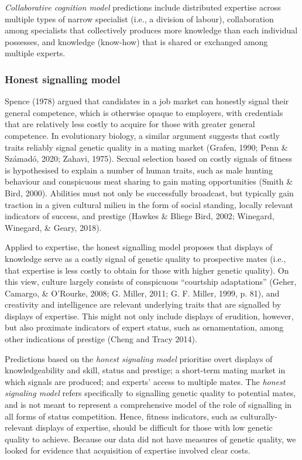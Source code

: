 \documentclass[
  11pt,
]{article}
\begin{document}
\emph{Collaborative cognition model} predictions include distributed expertise across multiple types of narrow specialist (i.e., a division of labour), collaboration among specialists that collectively produces more knowledge than each individual possesses, and knowledge (know-how) that is shared or exchanged among multiple experts.

\hypertarget{honest-signalling-model}{%
\subsubsection{Honest signalling model}\label{honest-signalling-model}}

Spence (1978) argued that candidates in a job market can honestly signal their general competence, which is otherwise opaque to employers, with credentials that are relatively less costly to acquire for those with greater general competence. In evolutionary biology, a similar argument suggests that costly traits reliably signal genetic quality in a mating market (Grafen, 1990; Penn \& Számadó, 2020; Zahavi, 1975). Sexual selection based on costly signals of fitness is hypothesised to explain a number of human traits, such as male hunting behaviour and conspicuous meat sharing to gain mating opportunities (Smith \& Bird, 2000). Abilities must not only be successfully broadcast, but typically gain traction in a given cultural milieu in the form of social standing, locally relevant indicators of success, and prestige (Hawkes \& Bliege Bird, 2002; Winegard, Winegard, \& Geary, 2018).

Applied to expertise, the honest signalling model proposes that displays of knowledge serve as a costly signal of genetic quality to prospective mates (i.e., that expertise is less costly to obtain for those with higher genetic quality). On this view, culture largely consists of conspicuous ``courtship adaptations'' (Geher, Camargo, \& O'Rourke, 2008; G. Miller, 2011; G. F. Miller, 1999, p. 81), and creativity and intelligence are relevant underlying traits that are signalled by displays of expertise. This might not only include displays of erudition, however, but also proximate indicators of expert status, such as ornamentation, among other indications of prestige (Cheng and Tracy 2014).

Predictions based on the \emph{honest signaling model} prioritise overt displays of knowledgeability and skill, status and prestige; a short-term mating market in which signals are produced; and experts' access to multiple mates. The \emph{honest signaling model} refers specifically to signalling genetic quality to potential mates, and is not meant to represent a comprehensive model of the role of signalling in all forms of status competition. Hence, fitness indicators, such as culturally-relevant displays of expertise, should be difficult for those with low genetic quality to achieve. Because our data did not have measures of genetic quality, we looked for evidence that acquisition of expertise involved clear costs.
\end{document}
